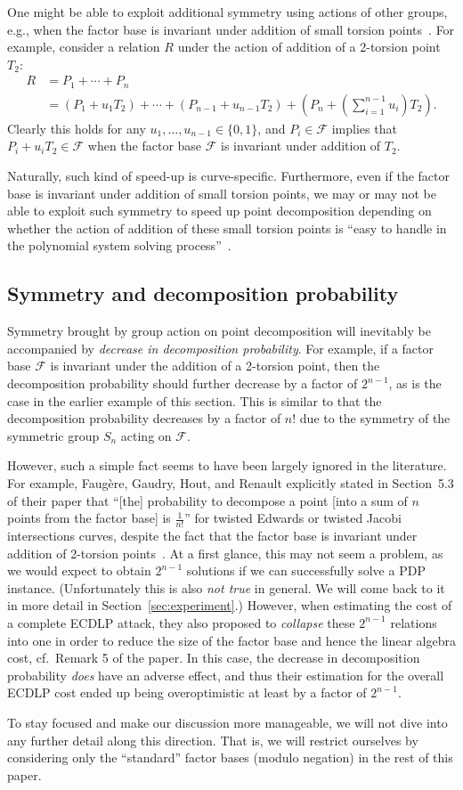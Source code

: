One might be able to exploit additional symmetry using actions of
other groups, e.g., when the factor base is invariant under addition
of small torsion points~\cite{DBLP:journals/joc/FaugereGHR14}.
%
For example, consider a relation $R$ under the action of addition of a
2-torsion point $T_2$:
\begin{align*}
  R & = P_1+\cdots+P_n \\
    & =
      (P_1+u_1T_2)+\cdots+(P_{n-1}+u_{n-1}T_2)+\left(P_n+\left(\sum_{i=1}^{n-1}u_i\right)T_2\right).
\end{align*}
%
Clearly this holds for any $u_1,\ldots,u_{n-1}\in\{0,1\}$, and
$P_i\in\mathcal F$ implies that $P_i+u_iT_2\in\mathcal F$ when the
factor base $\mathcal F$ is invariant under addition of $T_2$.

Naturally, such kind of speed-up is curve-specific.
%
Furthermore, even if the factor base is invariant under addition of
small torsion points, we may or may not be able to exploit such
symmetry to speed up point decomposition depending on whether the
action of addition of these small torsion points is ``easy to handle
in the polynomial system solving
process''~\cite{DBLP:journals/joc/FaugereGHR14}.

\subsection{Symmetry and decomposition probability}
\label{sec:symmetry-decomposition-probability}

Symmetry brought by group action on point decomposition will
inevitably be accompanied by \emph{decrease in decomposition
  probability}.
%
For example, if a factor base $\mathcal F$ is invariant under the
addition of a 2-torsion point, then the decomposition probability
should further decrease by a factor of $2^{n-1}$, as is the case in
the earlier example of this section.
%
This is similar to that the decomposition probability decreases by a
factor of $n!$ due to the symmetry of the symmetric group $S_n$ acting
on $\mathcal F$.

However, such a simple fact seems to have been largely ignored in the
literature.
%
For example, Faug\`ere, Gaudry, Hout, and Renault explicitly stated in
Section~5.3 of their paper that ``[the] probability to decompose a
point [into a sum of $n$ points from the factor base] is
$\frac{1}{n!}$'' for twisted Edwards or twisted Jacobi intersections
curves, despite the fact that the factor base is invariant under
addition of 2-torsion points~\cite{DBLP:journals/joc/FaugereGHR14}.
%
At a first glance, this may not seem a problem, as we would expect to
obtain $2^{n-1}$ solutions if we can successfully solve a PDP
instance.
%
(Unfortunately this is also \emph{not true} in general.  We will come
back to it in more detail in Section~\ref{sec:experiment}.)
% 
However, when estimating the cost of a complete ECDLP attack, they
also proposed to \emph{collapse} these $2^{n-1}$ relations into one in
order to reduce the size of the factor base and hence the linear
algebra cost, cf.~Remark 5 of the paper.
%
In this case, the decrease in decomposition probability \emph{does}
have an adverse effect, and thus their estimation for the overall
ECDLP cost ended up being overoptimistic at least by a factor of
$2^{n-1}$.

To stay focused and make our discussion more manageable, we will not
dive into any further detail along this direction.
%
That is, we will restrict ourselves by considering only the
``standard'' factor bases (modulo negation) in the rest of this paper.

